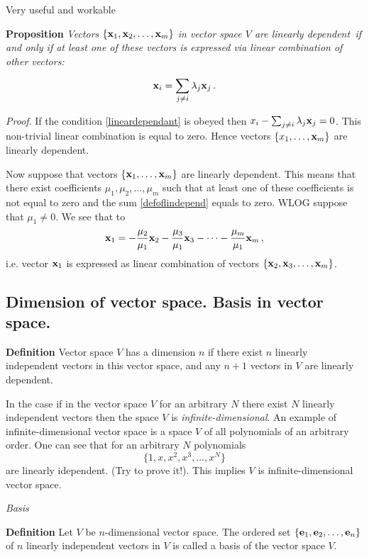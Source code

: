 \documentclass[12pt]{article}
\numberwithin{equation}{section}
\begin{document}
Very useful and workable

{\bf Proposition }
{\it Vectors $\{{\bf x}_1,{\bf x}_2,\dots,{\bf x}_m\}$ in vector space $V$ are {\it linearly dependent\,}
if and only if at least one of these vectors is expressed via linear combination of other vectors:}

               \begin{equation*}\label{lineardependant}
             {\bf x}_i=\sum_{j\not =i}\lambda_j{\bf x}_j\,.
               \end{equation*}
{\footnotesize
{\sl Proof}. If the condition \eqref{lineardependant} is obeyed then $x_i-\sum_{j\not =i}\lambda_j{\bf x}_j=0$. This non-trivial linear combination is equal to zero. Hence vectors $\{x_1,\dots,{\bf x}_m\}$ are linearly dependent.

   Now suppose that vectors $\{{\bf x}_1,\dots,{\bf x}_m\}$ are linearly dependent. This means that
   there exist
coefficients $\mu_1,\mu_2,\dots,\mu_m$ such that at least one of these coefficients is not equal to zero and
   the sum \eqref{defoflindepend} equals to zero. WLOG suppose that $\mu_1\not=0$. We see that
   to             $$
   {\bf x}_1=-{\mu_2\over \mu_1}{\bf x}_2-{\mu_3\over \mu_1}{\bf x}_3-\dots-{\mu_m\over \mu_1}{\bf x}_m\,,
                  $$
    i.e. vector ${\bf x}_1$ is expressed as linear combination of vectors $\{{\bf x}_2,{\bf x}_3,\dots,{\bf x}_m\}$\finish.

\m
}

   \subsection {Dimension of vector space. Basis in vector space.}\label{basis}


{\bf Definition }  Vector space $V$ has a dimension $n$  if there exist $n$  linearly independent vectors
in this vector space, and  any $n+1$ vectors in $V$ are  linearly dependent.

{\footnotesize In the
case if in the vector space $V$ for an arbitrary $N$
there exist $N$
linearly independent vectors
then the space $V$ is {\it infinite-dimensional}.
An example of infinite-dimensional vector space is a space $V$
of all polynomials of an arbitrary order. One can see that
for an arbitrary $N$ polynomials
           $$
\{1,x,x^2,x^3,\dots,x^N\}
           $$
are linearly idependent. (Try to prove it!).
This implies $V$ is infinite-dimensional vector space.
}

\m


  {\it Basis}

 {\bf Definition}
 Let $V$ be $n$-dimensional vector space.  
The ordered set $\{{\bf e}_1,{\bf e}_2,\dots,{\bf e}_n\}$
 of $n$  linearly independent vectors in $V$ is called a 
basis of the vector space
 $V$.
\m
\end{document}

